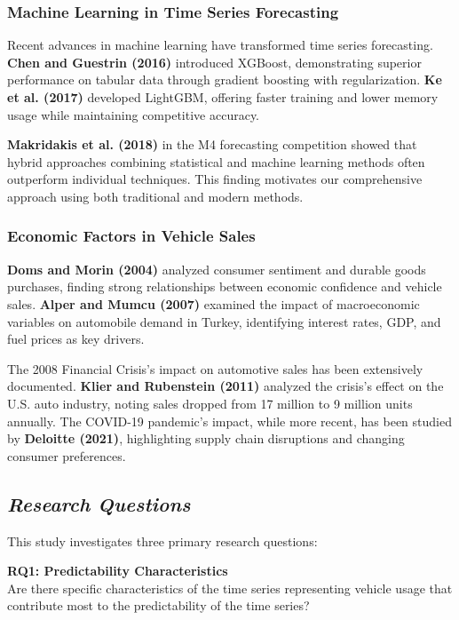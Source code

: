 \documentclass[12pt]{article}
\begin{document}
\subsubsection*{Machine Learning in Time Series Forecasting}

Recent advances in machine learning have transformed time series forecasting. \textbf{Chen and Guestrin (2016)} introduced XGBoost, demonstrating superior performance on tabular data through gradient boosting with regularization. \textbf{Ke et al. (2017)} developed LightGBM, offering faster training and lower memory usage while maintaining competitive accuracy.

\textbf{Makridakis et al. (2018)} in the M4 forecasting competition showed that hybrid approaches combining statistical and machine learning methods often outperform individual techniques. This finding motivates our comprehensive approach using both traditional and modern methods.

\subsubsection*{Economic Factors in Vehicle Sales}

\textbf{Doms and Morin (2004)} analyzed consumer sentiment and durable goods purchases, finding strong relationships between economic confidence and vehicle sales. \textbf{Alper and Mumcu (2007)} examined the impact of macroeconomic variables on automobile demand in Turkey, identifying interest rates, GDP, and fuel prices as key drivers.

The 2008 Financial Crisis's impact on automotive sales has been extensively documented. \textbf{Klier and Rubenstein (2011)} analyzed the crisis's effect on the U.S. auto industry, noting sales dropped from 17 million to 9 million units annually. The COVID-19 pandemic's impact, while more recent, has been studied by \textbf{Deloitte (2021)}, highlighting supply chain disruptions and changing consumer preferences.

\subsection*{\textit{Research Questions}}

This study investigates three primary research questions:

\textbf{RQ1: Predictability Characteristics}\\
Are there specific characteristics of the time series representing vehicle usage that contribute most to the predictability of the time series?
\end{document}
